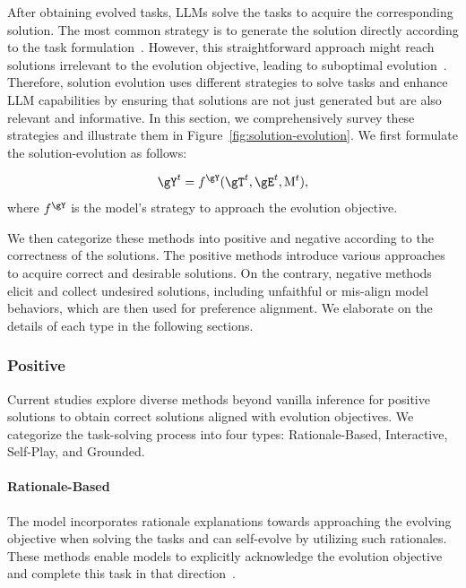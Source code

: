 \documentclass[sn-basic, Numbered]{sn-jnl}%
\theoremstyle{thmstyleone}%
\theoremstyle{thmstyletwo}%
\theoremstyle{thmstylethree}%
\begin{document}
After obtaining evolved tasks, LLMs solve the tasks to acquire the corresponding solution. 
The most common strategy is to generate the solution directly according to the task formulation~\cite{zelikman2022star,gulcehre2023reinforced,singh2023beyond,zheng2024kun,yuan2024self}.
However, this straightforward approach might reach solutions irrelevant to the evolution objective, leading to suboptimal evolution~\cite{hare2019dealing}.
Therefore, solution evolution uses different strategies to solve tasks and enhance LLM capabilities by ensuring that solutions are not just generated but are also relevant and informative. 
In this section, we comprehensively survey these strategies and illustrate them in Figure~\ref{fig:solution-evolution}.
We first formulate the solution-evolution as follows:

\begin{equation}
    \gY^{t} = f^{\gY}(\gT^{t}, \gE^{t}, \mathrm{M}^{t}),
\end{equation}
where $f^{\gY}$ is the model's strategy to approach the evolution objective. 

We then categorize these methods into positive and negative according to the correctness of the solutions.
The positive methods introduce various approaches to acquire correct and desirable solutions.
On the contrary, negative methods elicit and collect undesired solutions, including unfaithful or mis-align model behaviors, which are then used for preference alignment.
We elaborate on the details of each type in the following sections.

\subsubsection{Positive}
Current studies explore diverse methods beyond vanilla inference for positive solutions to obtain correct solutions aligned with evolution objectives.
We categorize the task-solving process into four types: Rationale-Based, Interactive, Self-Play, and Grounded.

\noindent\paragraph{Rationale-Based}
The model incorporates rationale explanations towards approaching the evolving objective when solving the tasks and can self-evolve by utilizing such rationales.
These methods enable models to explicitly acknowledge the evolution objective and complete this task in that direction~\cite{wei2022chain, yao2024tree, besta2024graph, yao2022react}. 
\end{document}
